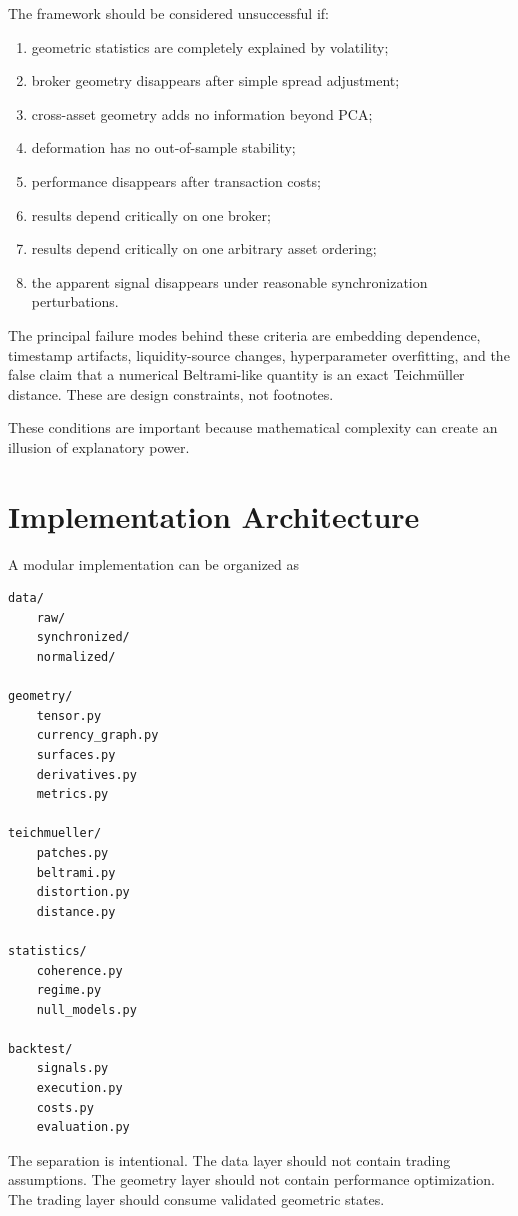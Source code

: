 \documentclass[11pt,a4paper]{article}
\numberwithin{equation}{section}
\begin{document}
The framework should be considered unsuccessful if:
\begin{enumerate}
\item geometric statistics are completely explained by volatility;
\item broker geometry disappears after simple spread adjustment;
\item cross-asset geometry adds no information beyond PCA;
\item deformation has no out-of-sample stability;
\item performance disappears after transaction costs;
\item results depend critically on one broker;
\item results depend critically on one arbitrary asset ordering;
\item the apparent signal disappears under reasonable
      synchronization perturbations.
\end{enumerate}

The principal failure modes behind these criteria are embedding
dependence, timestamp artifacts, liquidity-source changes,
hyperparameter overfitting, and the false claim that a numerical
Beltrami-like quantity is an exact Teichmüller distance. These are
design constraints, not footnotes.

These conditions are important because mathematical complexity can
create an illusion of explanatory power.

\section{Implementation Architecture}

A modular implementation can be organized as
\begin{verbatim}
data/
    raw/
    synchronized/
    normalized/

geometry/
    tensor.py
    currency_graph.py
    surfaces.py
    derivatives.py
    metrics.py

teichmueller/
    patches.py
    beltrami.py
    distortion.py
    distance.py

statistics/
    coherence.py
    regime.py
    null_models.py

backtest/
    signals.py
    execution.py
    costs.py
    evaluation.py
\end{verbatim}

The separation is intentional. The data layer should not contain
trading assumptions. The geometry layer should not contain
performance optimization. The trading layer should consume validated
geometric states.
\end{document}
